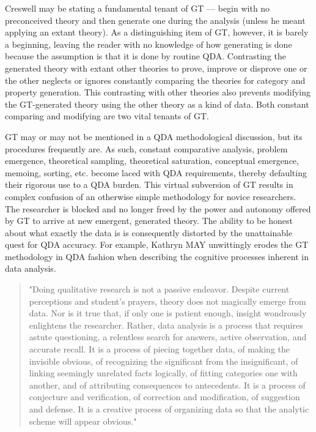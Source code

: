 Creswell may be stating a fundamental tenant of GT --- begin with no
preconceived theory and then generate one during the analysis (unless he meant applying an extant theory). 
As a distinguishing item of GT, however, it is barely a beginning, leaving the reader with no knowledge of how generating is done because the assumption is that it is done by routine QDA. 
Contrasting the generated theory with extant other theories to prove, improve or disprove one or the other neglects or ignores constantly comparing the theories for category and property generation. 
This contrasting with other theories also prevents modifying the GT-generated theory using the other theory as a kind of data.
Both constant comparing and modifying are two vital tenants of GT.

GT may or may not be mentioned in a QDA methodological discussion, 
but its procedures frequently are. 
As such, constant comparative analysis, problem emergence, theoretical sampling, theoretical saturation, conceptual emergence, memoing, sorting, etc. become laced with QDA requirements, thereby defaulting
their rigorous use to a QDA burden. 
This virtual subversion of GT results in complex confusion of an otherwise simple methodology for novice researchers.
The researcher is blocked and no longer freed by the power and autonomy offered by GT to arrive at new emergent, generated theory. 
The ability to be honest about what exactly the data is is consequently distorted by the unattainable quest for QDA accuracy. 
For example, Kathryn MAY unwittingly erodes the GT methodology in QDA fashion when describing the cognitive processes inherent in data analysis.

\begin{quote}
"Doing qualitative research is not a passive endeavor. Despite current
perceptions and student’s prayers, theory does not magically emerge
from data. Nor is it true that, if only one is patient enough, insight
wondrously enlightens the researcher. Rather, data analysis is a
process that requires astute questioning, a relentless search for
answers, active observation, and accurate recall. It is a process of
piecing together data, of making the invisible obvious, of recognizing the
significant from the insignificant, of linking seemingly unrelated facts
logically, of fitting categories one with another, and of attributing
consequences to antecedents. It is a process of conjecture and
verification, of correction and modification, of suggestion and defense. It
is a creative process of organizing data so that the analytic scheme will
appear obvious." 
\citep[p. 10]{incollection.may94}
\end{quote}

